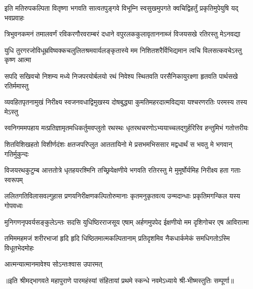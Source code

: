 

\twolineshloka
{इति मतिरुपकल्पिता वितृष्णा भगवति सात्वतपुङ्गवे विभूम्नि}
{स्वसुखमुपगते क्वचिद्विहर्तुं प्रकृतिमुपेयुषि यद् भवप्रवाहः}

\twolineshloka
{त्रिभुवनकमनं तमालवर्णं रविकरगौरवराम्बरं दधाने}
{वपुरलककुलावृताननाब्जं विजयसखे रतिरस्तु मेऽनवद्या}

\twolineshloka
{युधि तुरगरजोविधूम्रविष्वक्कचलुलितश्रमवार्यलङ्कृतास्ये}
{मम निशितशरैर्विभिद्यमान त्वचि विलसत्कवचेऽस्तु कृष्ण आत्मा}

\twolineshloka
{सपदि सखिवचो निशम्य मध्ये निजपरयोर्बलयो रथं निवेश्य}
{स्थितवति परसैनिकायुरक्ष्णा हृतवति पार्थसखे रतिर्ममास्तु}

\twolineshloka
{व्यवहितपृतनामुखं निरीक्ष्य स्वजनवधाद्विमुखस्य दोषबुद्ध्या}
{कुमतिमहरदात्मविद्यया यश्चरणरतिः परमस्य तस्य मेऽस्तु}

\twolineshloka
{स्वनिगममपहाय मत्प्रतिज्ञामृतमधिकर्तुमवप्लुतो रथस्थः}
{धृतरथचरणोऽभ्ययाच्चलद्गुर्हरिरिव हन्तुमिभं गतोत्तरीयः}

\twolineshloka
{शितविशिखहतो विशीर्णदंशः क्षतजपरिप्लुत आततायिनो मे}
{प्रसभमभिससार मद्वधार्थं स भवतु मे भगवान् गतिर्मुकुन्दः}

\twolineshloka
{विजयरथकुटुम्ब आत्ततोत्रे धृतहयरश्मिनि तच्छ्रियेक्षणीये}
{भगवति रतिरस्तु मे मुमूर्षोर्यमिह निरीक्ष्य हता गताः स्वरूपम्}

\twolineshloka
{ललितगतिविलासवल्गुहास प्रणयनिरीक्षणकल्पितोरुमानाः}
{कृतमनुकृतवत्य उन्मदान्धाः प्रकृतिमगन्किल यस्य गोपवध्वः}

\twolineshloka
{मुनिगणनृपवर्यसङ्कुलेऽन्तः सदसि युधिष्ठिरराजसूय एषाम्}
{अर्हणमुपपेद ईक्षणीयो मम दृशिगोचर एष आविरात्मा}

\twolineshloka
{तमिममहमजं शरीरभाजां हृदि हृदि धिष्ठितमात्मकल्पितानाम्}
{प्रतिदृशमिव नैकधार्कमेकं समधिगतोऽस्मि विधूतभेदमोहः}

{आत्मन्यात्मानमावेश्य सोऽन्तःश्वास उपारमत्}

{॥इति श्रीमद्भागवते महापुराणे पारमहंस्यां संहितायां प्रथमे स्कन्धे नवमेऽध्याये श्री-भीष्मस्तुतिः सम्पूर्णा॥}
